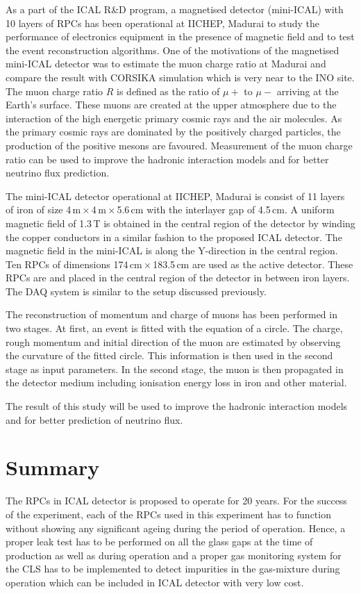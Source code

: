 \documentclass[a4paper,12pt,twoside]{article}
\begin{document}
As a part of the ICAL R\&D program, a magnetised detector (mini-ICAL) with 10 layers of RPCs has been operational at IICHEP, Madurai to study the performance of electronics equipment in the presence of magnetic field and to test the event reconstruction algorithms. One of the motivations of the magnetised mini-ICAL detector was to estimate the muon charge ratio at Madurai and compare the result with CORSIKA simulation which is very near to the INO site. The muon charge ratio $R$ is defined as the ratio of $\mu+$ to $\mu-$ arriving at the Earth's surface. These muons are created at the upper atmosphere due to the interaction of the high energetic primary cosmic rays and the air molecules. As the primary cosmic rays are dominated by the positively charged particles, the production of the positive mesons are favoured. Measurement of the muon charge ratio can be used to improve the hadronic interaction models and for better neutrino flux prediction.

The mini-ICAL detector operational at IICHEP, Madurai is consist of 11 layers of iron of size 4\,m\,$\times$\,4\,m\,$\times$\,5.6\,cm with the interlayer gap of 4.5\,cm. A uniform magnetic field of 1.3\,T is obtained in the central region of the detector by winding the copper conductors in a similar fashion to the proposed ICAL detector. The magnetic field in the mini-ICAL is along the Y-direction in the central region. Ten RPCs of dimensions 174\,cm\,$\times$\,183.5\,cm are used as the active detector. These RPCs are and placed in the central region of the detector in between iron layers. The DAQ system is similar to the setup discussed previously.

The reconstruction of momentum and charge of muons has been performed in two stages. At first, an event is fitted with the equation of a circle. The charge, rough momentum and initial direction of the muon are estimated by observing the curvature of the fitted circle. This information is then used in the second stage as input parameters. In the second stage, the muon is then propagated in the detector medium including ionisation energy loss in iron and other material.

The result of this study will be used to improve the hadronic interaction models and for better prediction of neutrino flux.

\section{Summary}
The RPCs in ICAL detector is proposed to operate for 20 years. For the success of the experiment, each of the RPCs used in this experiment has to function without showing any significant ageing during the period of operation. Hence, a proper leak test has to be performed on all the glass gaps at the time of production as well as during operation and a proper gas monitoring system for the CLS has to be implemented to detect impurities in the gas-mixture during operation which can be included in ICAL detector with very low cost.
\end{document}
